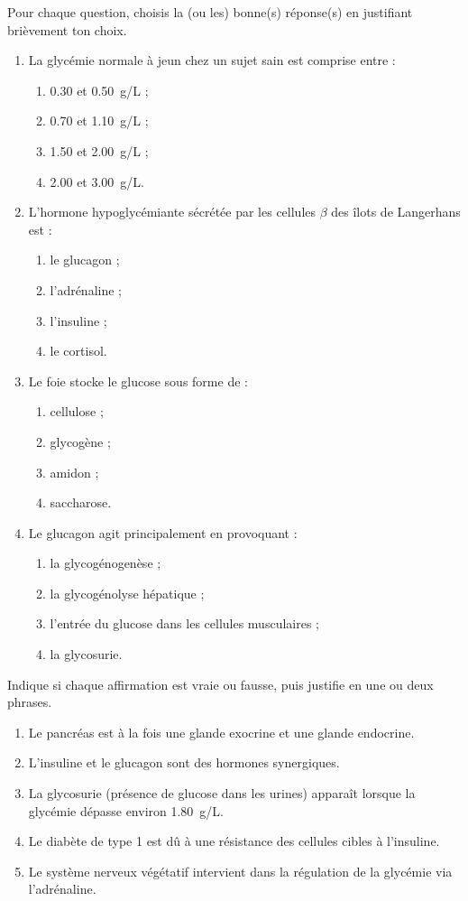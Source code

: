 \documentclass[11pt]{article}
\begin{document}
\begin{exercice}
Pour chaque question, choisis la (ou les) bonne(s) réponse(s) en justifiant brièvement ton choix.
\begin{enumerate}
\item La glycémie normale à jeun chez un sujet sain est comprise entre :
\begin{enumerate}
\item \num{0,30} et \SI{0,50}{g/L} ;
\item \num{0,70} et \SI{1,10}{g/L} ;
\item \num{1,50} et \SI{2,00}{g/L} ;
\item \num{2,00} et \SI{3,00}{g/L}.
\end{enumerate}
\item L'hormone hypoglycémiante sécrétée par les cellules $\beta$ des îlots de Langerhans est :
\begin{enumerate}
\item le glucagon ; \item l'adrénaline ; \item l'insuline ; \item le cortisol.
\end{enumerate}
\item Le foie stocke le glucose sous forme de :
\begin{enumerate}
\item cellulose ; \item glycogène ; \item amidon ; \item saccharose.
\end{enumerate}
\item Le glucagon agit principalement en provoquant :
\begin{enumerate}
\item la glycogénogenèse ; \item la glycogénolyse hépatique ; \item l'entrée du glucose dans les cellules musculaires ; \item la glycosurie.
\end{enumerate}
\end{enumerate}
\end{exercice}

\begin{exercice}
Indique si chaque affirmation est vraie ou fausse, puis justifie en une ou deux phrases.
\begin{enumerate}
\item Le pancréas est à la fois une glande exocrine et une glande endocrine.
\item L'insuline et le glucagon sont des hormones synergiques.
\item La glycosurie (présence de glucose dans les urines) apparaît lorsque la glycémie dépasse environ \SI{1,80}{g/L}.
\item Le diabète de type 1 est dû à une résistance des cellules cibles à l'insuline.
\item Le système nerveux végétatif intervient dans la régulation de la glycémie via l'adrénaline.
\end{enumerate}
\end{exercice}
\end{document}
